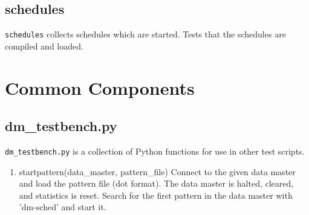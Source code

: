 \documentclass[12pt,a4paper]{report}
\begin{document}
\section{schedules}
\texttt{schedules} collects schedules which are started. Tests that the schedules are compiled and loaded.
\chapter{Common Components}
\section{dm\_testbench.py}
\texttt{dm\_testbench.py} is a collection of Python functions for use in other test scripts.
\begin{enumerate}
\item startpattern(data\_master, pattern\_file)
    Connect to the given data master and load the pattern file (dot format).
    The data master is halted, cleared, and statistics is reset.
    Search for the first pattern in the data master with 'dm-sched' and start it.
\end{enumerate}
\end{document}
